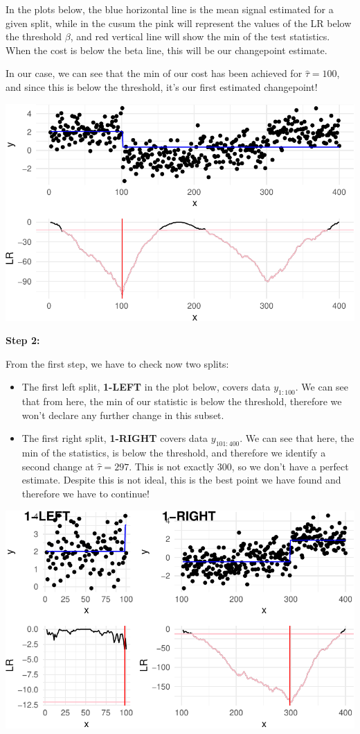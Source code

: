 \documentclass[
  letterpaper,
  DIV=11,
  numbers=noendperiod]{scrreprt}
\begin{document}
In the plots below, the blue horizontal line is the mean signal
estimated for a given split, while in the cusum the pink will represent
the values of the LR below the threshold \(\beta\), and red vertical
line will show the min of the test statistics. When the cost is below
the beta line, this will be our changepoint estimate.

In our case, we can see that the min of our cost has been achieved for
\(\hat\tau=100\), and since this is below the threshold, it's our first
estimated changepoint!

\includegraphics{3_multiple_changes_files/figure-pdf/unnamed-chunk-8-1.pdf}

\textbf{Step 2:}

From the first step, we have to check now two splits:

\begin{itemize}
\item
  The first left split, \textbf{1-LEFT} in the plot below, covers data
  \(y_{1:100}\). We can see that from here, the min of our statistic is
  below the threshold, therefore we won't declare any further change in
  this subset.
\item
  The first right split, \textbf{1-RIGHT} covers data \(y_{101:400}\).
  We can see that here, the min of the statistics, is below the
  threshold, and therefore we identify a second change at
  \(\hat\tau = 297\). This is not exactly 300, so we don't have a
  perfect estimate. Despite this is not ideal, this is the best point we
  have found and therefore we have to continue!
\end{itemize}

\includegraphics{3_multiple_changes_files/figure-pdf/unnamed-chunk-9-1.pdf}
\end{document}
